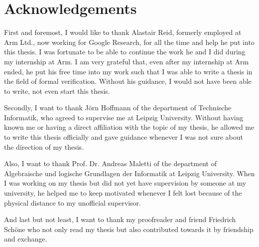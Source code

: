 \chapter*{\centering Acknowledgements}

First and foremost, I would like to thank Alastair Reid, formerly employed at Arm Ltd., now working for Google Research, for all the time and help he put into this thesis.
I was fortunate to be able to continue the work he and I did during my internship at Arm.
I am very grateful that, even after my internship at Arm ended, he put his free time into my work such that I was able to write a thesis in the field of formal verification.
Without his guidance, I would not have been able to write, not even start this thesis.

Secondly, I want to thank Jörn Hoffmann of the department of Technische Informatik, who agreed to supervise me at Leipzig University.
Without having known me or having a direct affiliation with the topic of my thesis, he allowed me to write this thesis officially and gave guidance whenever I was not sure about the direction of my thesis.

Also, I want to thank Prof. Dr. Andreas Maletti of the department of Algebraische und logische Grundlagen der Informatik at Leipzig University.
When I was working on my thesis but did not yet have supervision by someone at my university, he helped me to keep motivated whenever I felt lost because of the physical distance to my unofficial supervisor.

And last but not least, I want to thank my proofreader and friend Friedrich Schöne who not only read my thesis but also contributed towards it by friendship and exchange.
